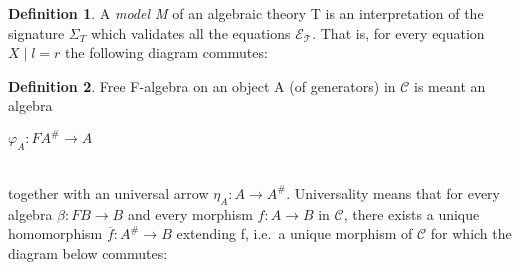 \documentclass[declaration,shortabstract]{iithesis}
\theoremstyle{definition} \newtheorem{definition}{Definition}[chapter]
\theoremstyle{remark} \newtheorem{remark}[definition]{Observation}
\theoremstyle{plain} \newtheorem{theorem}[definition]{Theorem}
\theoremstyle{plain} \newtheorem{lemma}[definition]{Lemma}
\begin{document}
    \begin{definition}

    A \textit{model M} of an algebraic theory T is an interpretation of the
    signature ${\Sigma_{T}}$ which validates all the equations $\mathcal{E_{T}}$.
    That is, for every equation $X \mid l = r$ the following diagram commutes:

    \begin{center}
    \end{center}

    \begin{center}
    \end{center}

    \end{definition}


    \begin{definition}

    Free F-algebra on an object A (of generators) in $\mathcal{C}$ is meant an algebra

    \begin{center}

    $ \varphi_{A} : F A^{\#} \longrightarrow A $

    \end{center}
    \\
    together with an universal arrow $ \eta_{A} : A \longrightarrow A^{\#} $. Universality means that for every algebra
    $ \beta : F B \longrightarrow B $ and every morphism $ f : A \longrightarrow B $ in $ \mathcal{C}$, there exists a unique homomorphism
    $ \overline{f} : A^{\#} \longrightarrow B $ extending f, i.e.\ a unique morphism of $ \mathcal{C}$ for which the diagram below
    commutes:

    \begin{center}
    \begin{tikzcd}[row sep=huge, column sep=large]
    \end{tikzcd}
    \end{center}

    \end{definition}
\end{document}
